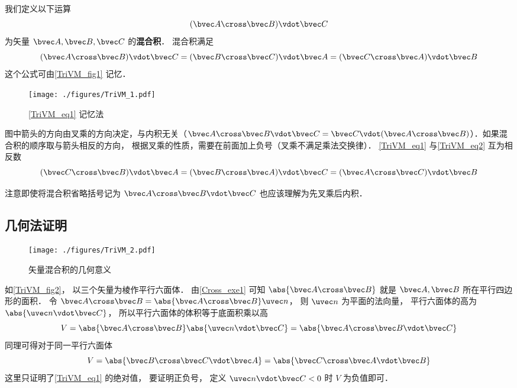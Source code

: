 
我们定义以下运算
\begin{equation}
(\bvec A \cross \bvec B) \vdot \bvec C
\end{equation}
为矢量 $\bvec A, \bvec B, \bvec C$ 的\textbf{混合积}． 混合积满足
\begin{equation}\label{TriVM_eq1}
(\bvec A \cross \bvec B) \vdot \bvec C = (\bvec B \cross \bvec C) \vdot \bvec A = (\bvec C \cross \bvec A) \vdot \bvec B 
\end{equation} 
这个公式可由\autoref{TriVM_fig1} 记忆．
\begin{figure}[ht]
\centering
\texttt{[image: ./figures/TriVM\_1.pdf]}
\caption{\autoref{TriVM_eq1} 记忆法}\label{TriVM_fig1}
\end{figure}
图中箭头的方向由叉乘的方向决定，与内积无关（$\bvec A\cross \bvec B \vdot \bvec C = \bvec C \vdot (\bvec A \cross \bvec B)$）．如果混合积的顺序取与箭头相反的方向， 根据叉乘的性质，需要在前面加上负号（叉乘不满足乘法交换律）． \autoref{TriVM_eq1} 与\autoref{TriVM_eq2} 互为相反数
\begin{equation}\label{TriVM_eq2}
(\bvec C \cross \bvec B) \vdot \bvec A = (\bvec B \cross \bvec A) \vdot \bvec C = (\bvec A \cross \bvec C) \vdot \bvec B
\end{equation}

注意即使将混合积省略括号记为 $\bvec A \cross \bvec B \vdot \bvec C$ 也应该理解为先叉乘后内积．

\subsection{几何法证明}

\begin{figure}[ht]
\centering
\texttt{[image: ./figures/TriVM\_2.pdf]}
\caption{矢量混合积的几何意义} \label{TriVM_fig2}
\end{figure}

如\autoref{TriVM_fig2}， 以三个矢量为棱作平行六面体． 由\autoref{Cross_exe1} 可知 $\abs{\bvec A \cross \bvec B}$ 就是 $\bvec A,\bvec B$ 所在平行四边形的面积． 令 $\bvec A \cross \bvec B = \abs{\bvec A \cross \bvec B} \uvec n$， 则 $\uvec n$ 为平面的法向量， 平行六面体的高为 $\abs{\uvec n \vdot \bvec C}$， 所以平行六面体的体积等于底面积乘以高
\begin{equation}
V = \abs{\bvec A \cross \bvec B} \abs{\uvec n \vdot \bvec C} = \abs{\bvec A \cross \bvec B \vdot \bvec C}
\end{equation}
同理可得对于同一平行六面体
\begin{equation}
V = \abs{\bvec B \cross \bvec C \vdot \bvec A} = \abs{\bvec C \cross \bvec A \vdot \bvec B} 
\end{equation}  
这里只证明了\autoref{TriVM_eq1} 的绝对值， 要证明正负号， 定义 $\uvec n \vdot \bvec C < 0$ 时 $V$ 为负值即可．

